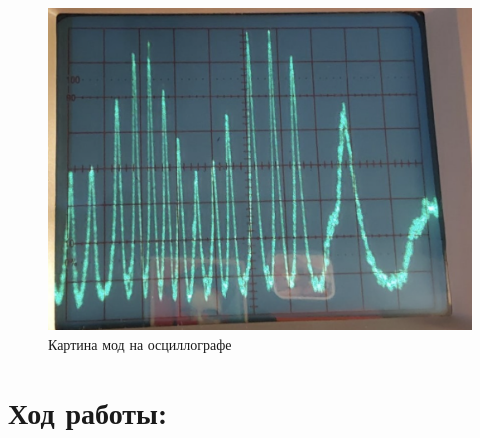 \documentclass[11pt]{article}
\begin{document}
\begin{figure}[H]
  \centering
  \includegraphics[width=\textwidth]{2.png}
  \caption{Картина мод на осциллографе}
  \label{fig:modes}
\end{figure}



\section{Ход работы:}
\end{document}

